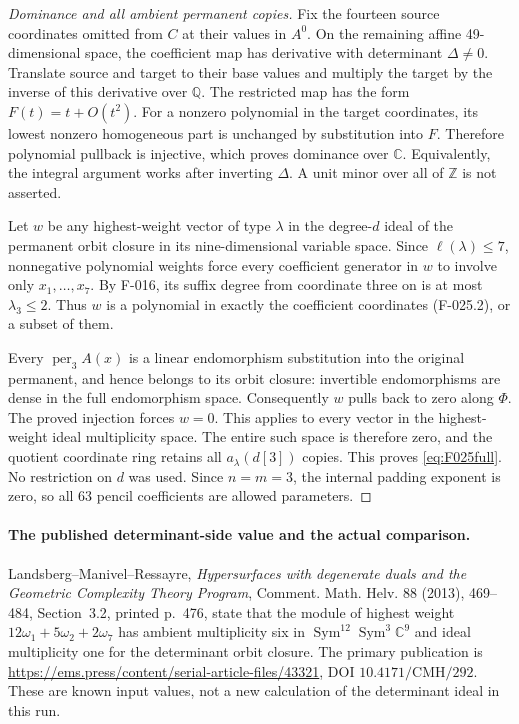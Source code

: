 \begin{proof}[Dominance and all ambient permanent copies]
Fix the fourteen source coordinates omitted from \(C\)
at their values in \(A^0\). On the remaining affine
49-dimensional space, the coefficient map has derivative
with determinant \(\Delta\ne0\). Translate source and
target to their base values and multiply the target by
the inverse of this derivative over \(\mathbb Q\).
The restricted map has the form \(F(t)=t+O(t^2)\).
For a nonzero polynomial in the target coordinates, its
lowest nonzero homogeneous part is unchanged by substitution
into \(F\). Therefore polynomial pullback is injective,
which proves dominance over \(\mathbb C\).
Equivalently, the integral argument works after inverting
\(\Delta\). A unit minor over all of \(\mathbb Z\)
is not asserted.

Let \(w\) be any highest-weight vector of type \(\lambda\)
in the degree-\(d\) ideal of the permanent orbit closure
in its nine-dimensional variable space. Since
\(\ell(\lambda)\leq7\), nonnegative polynomial weights
force every coefficient generator in \(w\) to involve
only \(x_1,\ldots,x_7\). By F-016, its suffix degree
from coordinate three on is at most \(\lambda_3\leq2\).
Thus \(w\) is a polynomial in exactly the coefficient
coordinates (F-025.2), or a subset of them.

Every \(\operatorname{per}_3 A(x)\) is a linear
endomorphism substitution into the original permanent,
and hence belongs to its orbit closure: invertible
endomorphisms are dense in the full endomorphism space.
Consequently \(w\) pulls back to zero along \(\Phi\).
The proved injection forces \(w=0\). This applies to
every vector in the highest-weight ideal multiplicity space.
The entire such space is therefore zero, and the quotient
coordinate ring retains all \(a_\lambda(d[3])\) copies.
This proves \eqref{eq:F025full}. No restriction on \(d\)
was used. Since \(n=m=3\), the internal padding exponent
is zero, so all 63 pencil coefficients are allowed parameters.
\end{proof}

\paragraph{The published determinant-side value and the actual comparison.}
Landsberg--Manivel--Ressayre,
\emph{Hypersurfaces with degenerate duals and the Geometric
Complexity Theory Program}, Comment. Math. Helv. 88 (2013),
469--484, Section~3.2, printed p.~476, state that the module
of highest weight \(12\omega_1+5\omega_2+2\omega_7\)
has ambient multiplicity six in
\(\operatorname{Sym}^{12}\operatorname{Sym}^3\mathbb C^9\)
and ideal multiplicity one for the determinant orbit closure.
The primary publication is
\url{https://ems.press/content/serial-article-files/43321},
DOI \(10.4171/\mathrm{CMH}/292\).
These are known input values, not a new calculation of the
determinant ideal in this run.

